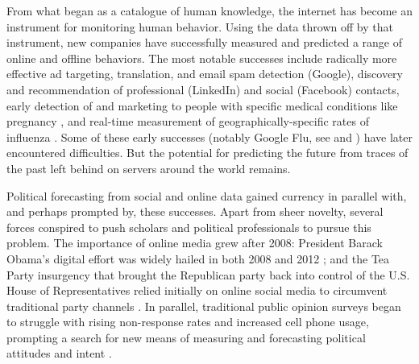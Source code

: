 \documentclass{article}
\begin{document}

From what began as a catalogue of human knowledge, the internet has
become an instrument for monitoring human behavior. Using the data
thrown off by that instrument, new companies have successfully
measured and predicted a range of online and offline behaviors. The
most notable successes include radically more effective ad targeting,
translation, 
and email spam detection
(Google), discovery and recommendation of professional (LinkedIn) and
social (Facebook) contacts, early detection of and marketing to people
with specific medical conditions like pregnancy \citep{hill2012},
and real-time measurement of geographically-specific rates of influenza
\citep{ginsberg2008detecting}. Some of these early successes (notably Google
Flu, see \cite{butler2013google} and \cite{41763}) have later encountered
difficulties. But the potential for predicting the future from 
traces of the past left behind on servers around the world remains.

Political forecasting from social and online data gained currency in
parallel with, and perhaps prompted by, these successes. Apart from
sheer novelty, several forces conspired to push scholars and political
professionals to pursue this problem. The importance of online media grew after
2008: President Barack Obama's digital effort was widely hailed in
both 2008 and 2012
\citep{smith2009internet,levenshus2010online,wallsten2010yes,scherer2012}; and the
Tea Party insurgency that brought the Republican party back into
control of the U.S. House of Representatives relied initially on
online social media to circumvent traditional party channels
\citep{williamson2011tea}. In parallel, traditional public opinion
surveys began to struggle with rising non-response rates and increased
cell phone usage, prompting a search for new means of measuring and
forecasting political attitudes and intent
\citep{keeter2006gauging,christian2010assessing,kohut2012assessing,boyle2013sampling,viera2013mail}.
\end{document}
